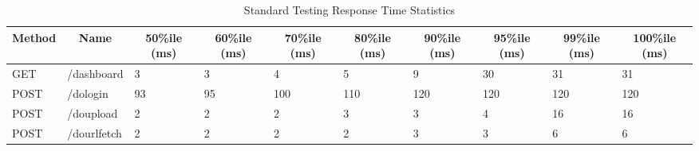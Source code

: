 \begin{table*}[]
  \caption{Standard Testing Response Time Statistics}
  \label{tab:stdrespstat}
  \begin{tabular}{|l|l|l|l|l|l|l|l|l|l|}
  \hline
  \multicolumn{1}{|c|}{\textbf{Method}} & \multicolumn{1}{c|}{\textbf{Name}} & \multicolumn{1}{c|}{\textbf{50\%ile (ms)}} & \multicolumn{1}{c|}{\textbf{60\%ile (ms)}} & \multicolumn{1}{c|}{\textbf{70\%ile (ms)}} & \multicolumn{1}{c|}{\textbf{80\%ile (ms)}} & \multicolumn{1}{c|}{\textbf{90\%ile (ms)}} & \multicolumn{1}{c|}{\textbf{95\%ile (ms)}} & \multicolumn{1}{c|}{\textbf{99\%ile (ms)}} & \multicolumn{1}{c|}{\textbf{100\%ile (ms)}} \\ \hline
  GET                                   & /dashboard                         & 3                                          & 3                                          & 4                                          & 5                                          & 9                                          & 30                                         & 31                                         & 31                                          \\ \hline
  {\color[HTML]{2A2B2E} POST}           & /dologin                           & 93                                         & 95                                         & 100                                        & 110                                        & 120                                        & 120                                        & 120                                        & 120                                         \\ \hline
  {\color[HTML]{2A2B2E} POST}           & /doupload                          & 2                                          & 2                                          & 2                                          & 3                                          & 3                                          & 4                                          & 16                                         & 16                                          \\ \hline
  POST                                  & /dourlfetch                        & 2                                          & 2                                          & 2                                          & 2                                          & 3                                          & 3                                          & 6                                          & 6                                           \\ \hline

\end{tabular}
\end{table*}
